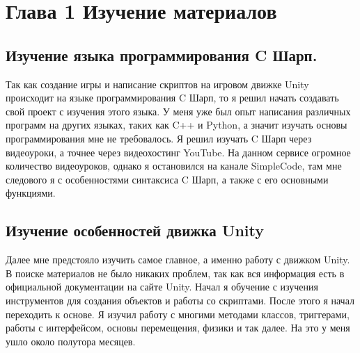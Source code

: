 \section {Глава 1 Изучение материалов}
\subsection{ Изучение языка программирования C Шарп.}
Так как создание игры и написание скриптов на игровом движке Unity
происходит на языке программирования C Шарп, то я решил начать создавать свой
проект с изучения этого языка. У меня уже был опыт написания различных
программ на других языках, таких как C++ и Python, а значит изучать основы
программирования мне не требовалось. Я решил изучать C Шарп через видеоуроки,
а точнее через видеохостинг YouTube. На данном сервисе огромное количество
видеоуроков, однако я остановился на канале SimpleCode, там мне следового я
с особенностями синтаксиса C Шарп, а также с его основными функциями. \newline
\subsection{ Изучение особенностей движка Unity}
Далее мне предстояло изучить самое главное, а именно работу с движком
Unity. В поиске материалов не было никаких проблем, так как вся информация
есть в официальной документации на сайте Unity. \newline
Начал я обучение с изучения инструментов для создания объектов и
работы со скриптами. После этого я начал переходить к основе. Я изучил
работу с многими методами классов, триггерами, работы с интерфейсом,
основы перемещения, физики и так далее. На это у меня ушло около полутора
месяцев.

